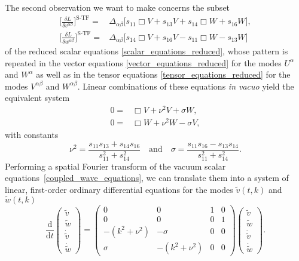 The second observation we want to make concerns the subset
\begin{equation}
  \begin{aligned}
  \bigg\lbrack\frac{\delta L}{\delta v^{\alpha\beta}}\bigg\rbrack^\text{S-TF} = {} & \Delta_{\alpha\beta} \bigg\lbrack s_{11} \Box V + s_{13} V + s_{14} \Box W + s_{16} W \bigg\rbrack, \\
  \bigg\lbrack\frac{\delta L}{\delta w^{\alpha\beta}}\bigg\rbrack^\text{S-TF} = {} & \Delta_{\alpha\beta} \bigg\lbrack s_{14} \Box V + s_{16} V - s_{11} \Box W - s_{13} W \bigg\rbrack
  \end{aligned}
\end{equation}
of the reduced scalar equations \eqref{scalar_equations_reduced}, whose pattern is repeated in the vector equations \eqref{vector_equations_reduced} for the modes $U^\alpha$ and $W^\alpha$ as well as in the tensor equations \eqref{tensor_equations_reduced} for the modes $V^{\alpha\beta}$ and $W^{\alpha\beta}$. Linear combinations of these equations \emph{in vacuo} yield the equivalent system
\begin{equation}\label{coupled_wave_equations}
  \begin{aligned}
    0 = {} & \Box V + \nu^2 V + \sigma W, \\
    0 = {} & \Box W + \nu^2 W - \sigma V,
  \end{aligned}
\end{equation}
with constants
\begin{equation}
  \nu^2 = \frac{s_{11}s_{13}+s_{14}s_{16}}{s_{11}^2+s_{14}^2}\quad\text{and}\quad\sigma = \frac{s_{11}s_{16} - s_{13} s_{14}}{s_{11}^2 + s_{14}^2}.
\end{equation}
Performing a spatial Fourier transform of the vacuum scalar equations~\eqref{coupled_wave_equations}, we can translate them into a system of linear, first-order ordinary differential equations for the modes $\tilde v(t,k)$ and $\tilde w(t,k)$
\begin{equation}
  \frac{\mathrm d}{\mathrm dt}\begin{pmatrix}\tilde v \\ \tilde w \\ \dot{\tilde v} \\ \dot{\tilde w}\end{pmatrix} = \begin{pmatrix}0 & 0 & 1 & 0 \\ 0 & 0 & 0 & 1 \\ -(k^2 + \nu^2) & -\sigma & 0 & 0 \\ \sigma & -(k^2 + \nu^2) & 0 & 0\end{pmatrix}\begin{pmatrix}\tilde v \\ \tilde w \\ \dot{\tilde v} \\ \dot{\tilde w}\end{pmatrix}.
\end{equation}
